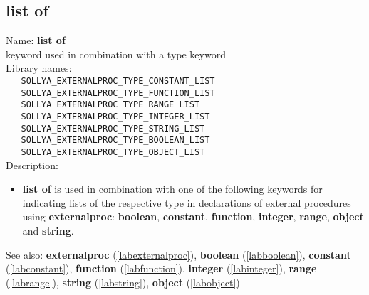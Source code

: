 \subsection{list of}
\label{lablistof}
\noindent Name: \textbf{list of}\\
\phantom{aaa}keyword used in combination with a type keyword\\[0.2cm]
\noindent Library names:\\
\verb|   SOLLYA_EXTERNALPROC_TYPE_CONSTANT_LIST|\\
\verb|   SOLLYA_EXTERNALPROC_TYPE_FUNCTION_LIST|\\
\verb|   SOLLYA_EXTERNALPROC_TYPE_RANGE_LIST|\\
\verb|   SOLLYA_EXTERNALPROC_TYPE_INTEGER_LIST|\\
\verb|   SOLLYA_EXTERNALPROC_TYPE_STRING_LIST|\\
\verb|   SOLLYA_EXTERNALPROC_TYPE_BOOLEAN_LIST|\\
\verb|   SOLLYA_EXTERNALPROC_TYPE_OBJECT_LIST|\\[0.2cm]
\noindent Description: \begin{itemize}

\item \textbf{list of} is used in combination with one of the following keywords for
   indicating lists of the respective type in declarations of external
   procedures using \textbf{externalproc}: \textbf{boolean}, \textbf{constant}, \textbf{function},
   \textbf{integer}, \textbf{range}, \textbf{object} and \textbf{string}.
\end{itemize}
See also: \textbf{externalproc} (\ref{labexternalproc}), \textbf{boolean} (\ref{labboolean}), \textbf{constant} (\ref{labconstant}), \textbf{function} (\ref{labfunction}), \textbf{integer} (\ref{labinteger}), \textbf{range} (\ref{labrange}), \textbf{string} (\ref{labstring}), \textbf{object} (\ref{labobject})

